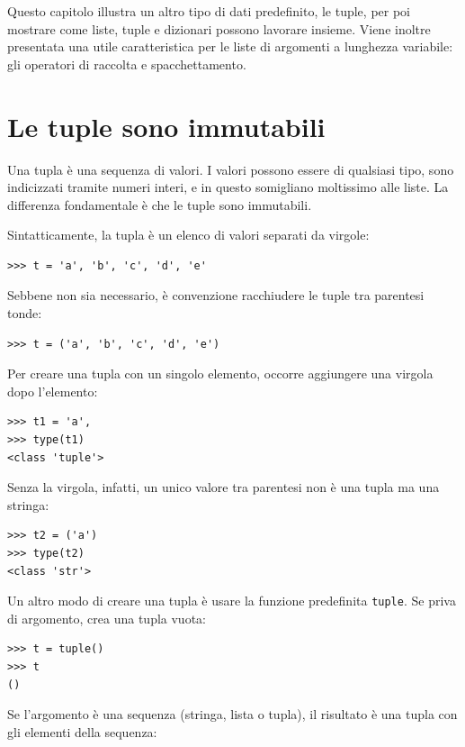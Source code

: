 \documentclass[10pt]{book}
\begin{document}
Questo capitolo illustra un altro tipo di dati predefinito, le tuple, per poi mostrare come liste, tuple e dizionari possono lavorare insieme. Viene inoltre presentata una utile caratteristica per le liste di argomenti a lunghezza variabile: gli operatori di raccolta e spacchettamento.

\section{Le tuple sono immutabili}

Una tupla è una sequenza di valori. I valori possono essere di qualsiasi tipo, sono indicizzati tramite numeri interi, e in questo somigliano moltissimo alle liste. La differenza fondamentale è che le tuple sono immutabili.

Sintatticamente, la tupla è un elenco di valori separati da virgole:

\begin{verbatim}
>>> t = 'a', 'b', 'c', 'd', 'e'
\end{verbatim}
%
Sebbene non sia necessario, è convenzione racchiudere le tuple tra
   parentesi tonde:

\begin{verbatim}
>>> t = ('a', 'b', 'c', 'd', 'e')
\end{verbatim}
%
Per creare una tupla con un singolo elemento, occorre aggiungere una
virgola dopo l'elemento:

\begin{verbatim}
>>> t1 = 'a',
>>> type(t1)
<class 'tuple'>
\end{verbatim}
%
Senza la virgola, infatti, un unico valore tra parentesi non è una tupla ma una stringa:

\begin{verbatim}
>>> t2 = ('a')
>>> type(t2)
<class 'str'>
\end{verbatim}
%
Un altro modo di creare una tupla è usare la funzione predefinita {\tt tuple}.
Se priva di argomento, crea una tupla vuota:

\begin{verbatim}
>>> t = tuple()
>>> t
()
\end{verbatim}
%
Se l'argomento è una sequenza (stringa, lista o tupla), il risultato è una tupla con gli elementi della sequenza:
\end{document}
